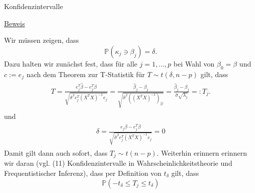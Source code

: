 \documentclass[
  8pt,
  ignorenonframetext,
]{beamer}
\begin{document}
\begin{frame}{Konfidenzintervalle}
\protect\hypertarget{konfidenzintervalle-1}{}
\footnotesize

\underline{Beweis}

Wir müssen zeigen, dass \begin{equation}
\mathbb{P}(\kappa_j \ni \beta_j) = \delta.
\end{equation} Dazu halten wir zunächst fest, dass für alle
\(j = 1,...,p\) bei Wahl von \(\beta_0 = \beta\) und \(c := e_j\) nach
dem Theorem zur T-Statistik für \(T \sim t(\delta,n-p)\) gilt, dass
\begin{align}
\begin{split}
T 
= \frac{e_j^T\hat{\beta} - e_j^T\beta}{\sqrt{\hat{\sigma}^2e_j^T\left(X^TX\right)^{-1}e_j}} 
= \frac{\hat{\beta}_j - \beta_j}{\sqrt{\hat{\sigma}^2 \left(\left(X^TX \right)^{-1}\right)_{jj}}}
= \frac{\hat{\beta}_j - \beta_j}{\hat{\sigma} \sqrt{\lambda_j}}
=: T_j.
\end{split}
\end{align} und \begin{align}
\begin{split}
\delta
= \frac{e_j\beta - e_j^T\beta}{\sqrt{\hat{\sigma}^2e_j^T\left(X^TX\right)^{-1}e_j}} 
= 0
\end{split}
\end{align} Damit gilt dann auch sofort, dass \(T_j \sim t(n-p)\).
Weiterhin erinnern erinnern wir daran (vgl. (11) Konfidenzintervalle in
Wahrscheinlichkeitstheorie und Frequentistischer Inferenz), dass per
Definition von \(t_\delta\) gilt, dass \begin{equation}
\mathbb{P}\left(-t_\delta \le T_j \le t_\delta \right)
\end{equation}
\end{frame}
\end{document}
